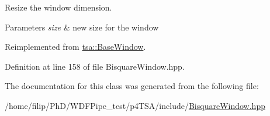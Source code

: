 Resize the window dimension.


\begin{DoxyParams}{Parameters}
{\em size} & new size for the window \\
\hline
\end{DoxyParams}


Reimplemented from \hyperlink{classtsa_1_1_base_window_a8a2a3425f2915762d50fa57dd0e04f22}{tsa\+::\+Base\+Window}.



Definition at line 158 of file Bisquare\+Window.\+hpp.



The documentation for this class was generated from the following file\+:\begin{DoxyCompactItemize}
\item 
/home/filip/\+Ph\+D/\+W\+D\+F\+Pipe\+\_\+test/p4\+T\+S\+A/include/\hyperlink{_bisquare_window_8hpp}{Bisquare\+Window.\+hpp}\end{DoxyCompactItemize}
